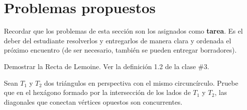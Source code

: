 \section{Problemas propuestos}

Recordar que los problemas de esta sección son los asignados como \textbf{tarea}.
Es el deber del estudiante resolverlos y entregarlos de manera clara y ordenada el próximo encuentro
(de ser necesario, también se pueden entregar borradores).

\begin{section-problem}
    Demostrar la Recta de Lemoine.
    Ver la definición 1.2 de la clase \#3.
\end{section-problem}

\begin{section-problem}
    Sean $T_1$ y $T_2$ dos triángulos en perspectiva con el mismo circuncírculo.
    Pruebe que en el hexágono formado por la intersección de los lados de $T_1$ y $T_2$, las diagonales que conectan vértices opuestos son concurrentes.
\end{section-problem}